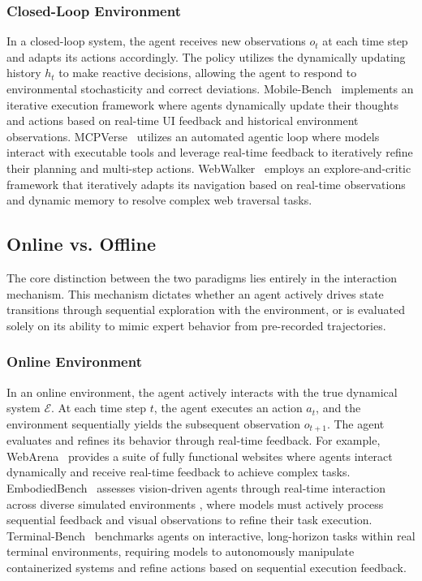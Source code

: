 \documentclass{llmxive}
\begin{document}
\subsubsection{Closed-Loop Environment}
In a closed-loop system, the agent receives new observations $o_t$ at each time step and adapts its actions accordingly. The policy utilizes the dynamically updating history $h_t$ to make reactive decisions, allowing the agent to respond to environmental stochasticity and correct deviations. Mobile-Bench~\cite{Mobile-Bench} implements an iterative execution framework where agents dynamically update their thoughts and actions based on real-time UI feedback and historical environment observations. MCPVerse~\cite{MCPVerse} utilizes an automated agentic loop where models interact with executable tools and leverage real-time feedback to iteratively refine their planning and multi-step actions. WebWalker~\cite{WebWalker} employs an explore-and-critic framework that iteratively adapts its navigation based on real-time observations and dynamic memory to resolve complex web traversal tasks.

\subsection{Online vs. Offline}
\label{attribute:Online vs. Offline}
The core distinction between the two paradigms lies entirely in the interaction mechanism. This mechanism dictates whether an agent actively drives state transitions through sequential exploration with the environment, or is evaluated solely on its ability to mimic expert behavior from pre-recorded trajectories.

\subsubsection{Online Environment}
In an online environment, the agent actively interacts with the true dynamical system $\mathcal{E}$. At each time step $t$, the agent executes an action $a_t$, and the environment sequentially yields the subsequent observation $o_{t+1}$. The agent evaluates and refines its behavior through real-time feedback. For example, WebArena~\cite{WebArena} provides a suite of fully functional websites where agents interact dynamically and receive real-time feedback to achieve complex tasks. EmbodiedBench~\cite{EmbodiedBench} assesses vision-driven agents through real-time interaction across diverse simulated environments , where models must actively process sequential feedback and visual observations to refine their task execution. Terminal-Bench~\cite{Terminal-Bench} benchmarks agents on interactive, long-horizon tasks within real terminal environments, requiring models to autonomously manipulate containerized systems and refine actions based on sequential execution feedback.
\end{document}
